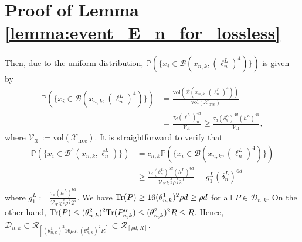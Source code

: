 \documentclass[Afour,sageh,times]{sagej}
\begin{document}
\section{Proof of Lemma \ref{lemma:event_E_n_for_lossless}\label{appedix:event_en_lossless}}
Then, due to the uniform distribution, $    \mathbb{P}(\{x_i\in\mathcal{B}(x_{n,k},(\ell^L_n)^4)\})$ is given by
\begin{align} \nonumber
    \mathbb{P}(\{x_i\in\mathcal{B}(x_{n,k},(\ell^L_n)^4)\})&=\frac{\text{vol}(\mathcal{B}(x_{n,k},(\ell^L_n)^4))}{\text{vol}(\mathcal{X}_{\text{free}})}\nonumber\\
    &=\frac{\tau_d(\ell^L)^{4d}_n}{\mathcal{V}_{\mathcal{X}}}\geq\frac{\tau_d(\delta^L_n)^{4d}(h^L)^{4d}}{\mathcal{V}_{\mathcal{X}}},\nonumber
\end{align}
where $\mathcal{V}_{\mathcal{X} }:=\text{vol}(\mathcal{X}_{\text{free}})$. It
is straightforward to verify that
\begin{align} \nonumber
    \mathbb{P}(\{x_i\in\mathcal{B}^s(x_{n,k},\ell^L_n)\})\!&=\!c_{n,k} \mathbb{P}(\{x_i\in\mathcal{B}(x_{n,k},(\ell^L_n)^4)\}) \\ \nonumber
    &\geq\frac{ \tau_d(\delta^L_n)^{6d}(h^L)^{6d}}{\mathcal{V}_{\mathcal{X}}\chi^\frac{d}{2}\rho^{\frac{d}{4}} 2^d}=g^L_1 (\delta^L_n)^{6d}
\end{align}
where $g^L_1:=\frac{ \tau_d (h^L)^{6d}}{\mathcal{V}_{\mathcal{X}}\chi^\frac{d}{2}\rho^{\frac{d}{4}} 2^d}$.
We have  $\textup{Tr}(P) \geq 16 (\theta^1_{n,k})^2  \rho d \geq \rho d$ for all $P \in \mathcal{D}_{n, k}$.
On the other hand, $\textup{Tr}(P)\leq (\theta^2_{n,k})^2 \textup{Tr}(P''_{n,k}) \leq  (\theta^2_{n,k})^2 R \leq R $. Hence, $\mathcal{D}_{n,k} \subset \mathcal{R}_{ [(\theta^1_{n,k})^2  16\rho d, (\theta^2_{n,k})^2 R ]} \subset \mathcal{R}_{ [ \rho d, R ]}$.
\end{document}
